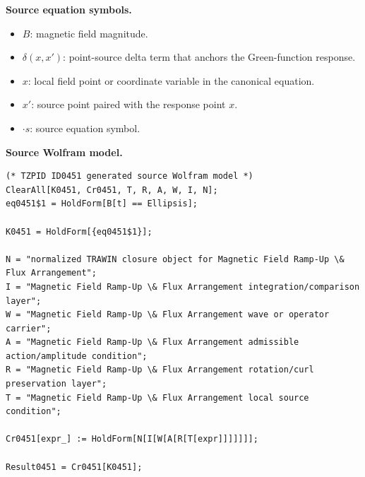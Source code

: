 \begin{minipage}[t]{0.49\linewidth}
\begingroup
\small
\raggedright
\textbf{Source equation symbols.}\par
\begin{itemize}[leftmargin=1.35em,itemsep=1pt,topsep=1pt,parsep=0pt]
    \item $B$: magnetic field magnitude.
    \item $\delta(x,x')$: point-source delta term that anchors the Green-function response.
    \item $x$: local field point or coordinate variable in the canonical equation.
    \item $x'$: source point paired with the response point $x$.
    \item $\cdot s$: source equation symbol.
\end{itemize}
\endgroup
\end{minipage}\hfill
\begin{minipage}[t]{0.47\linewidth}
\begingroup
\scriptsize
\raggedright
\textbf{Source Wolfram model.}\par
\begin{Verbatim}[fontsize=\tiny,breaklines=true,breakanywhere=true]
(* TZPID ID0451 generated source Wolfram model *)
ClearAll[K0451, Cr0451, T, R, A, W, I, N];
eq0451$1 = HoldForm[B[t] == Ellipsis];

K0451 = HoldForm[{eq0451$1}];

N = "normalized TRAWIN closure object for Magnetic Field Ramp-Up \& Flux Arrangement";
I = "Magnetic Field Ramp-Up \& Flux Arrangement integration/comparison layer";
W = "Magnetic Field Ramp-Up \& Flux Arrangement wave or operator carrier";
A = "Magnetic Field Ramp-Up \& Flux Arrangement admissible action/amplitude condition";
R = "Magnetic Field Ramp-Up \& Flux Arrangement rotation/curl preservation layer";
T = "Magnetic Field Ramp-Up \& Flux Arrangement local source condition";

Cr0451[expr_] := HoldForm[N[I[W[A[R[T[expr]]]]]]];

Result0451 = Cr0451[K0451];
\end{Verbatim}
\endgroup
\end{minipage}

